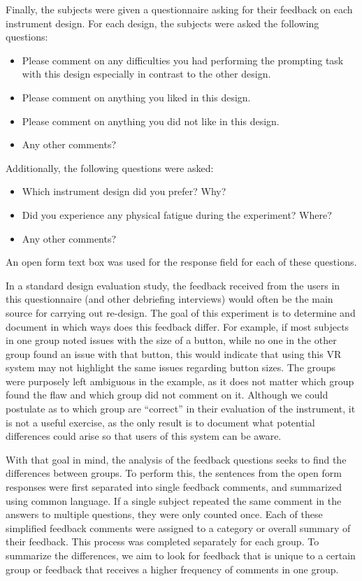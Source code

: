 Finally, the subjects were given a questionnaire asking for their feedback on each instrument design.
For each design, the subjects were asked the following questions:
\begin{itemize}
    \item Please comment on any difficulties you had performing the prompting task with this design especially in contrast to the other design.
    \item Please comment on anything you liked in this design.
    \item Please comment on anything you did not like in this design.
    \item Any other comments?
\end{itemize}
Additionally, the following questions were asked:
\begin{itemize}
    \item Which instrument design did you prefer? Why?
    \item Did you experience any physical fatigue during the experiment? Where?
    \item Any other comments?
\end{itemize}
An open form text box was used for the response field for each of these questions.

In a standard design evaluation study, the feedback received from the users in this questionnaire (and other debriefing interviews) would often be the main source for carrying out re-design.
The goal of this experiment is to determine and document in which ways does this feedback differ.
For example, if most subjects in one group noted issues with the size of a button, while no one in the other group found an issue with that button, this would indicate that using this VR system may not highlight the same issues regarding button sizes.
The groups were purposely left ambiguous in the example, as it does not matter which group found the flaw and which group did not comment on it.
Although we could postulate as to which group are ``correct'' in their evaluation of the instrument, it is not a useful exercise, as the only result is to document what potential differences could arise so that users of this system can be aware.

With that goal in mind, the analysis of the feedback questions seeks to find the differences between groups.
To perform this, the sentences from the open form responses were first separated into single feedback comments, and summarized using common language.
If a single subject repeated the same comment in the answers to multiple questions, they were only counted once.
Each of these simplified feedback comments were assigned to a category or overall summary of their feedback.
This process was completed separately for each group.
To summarize the differences, we aim to look for feedback that is unique to a certain group or feedback that receives a higher frequency of comments in one group.


